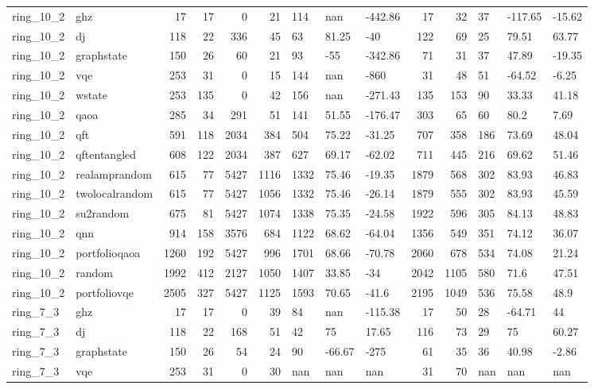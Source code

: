 \begin{longtable}{llrrrrlllrrlll}
ring\_10\_2 & ghz & 17 & 17 & 0 & 21 & 114 & nan & -442.86 & 17 & 32 & 37 & -117.65 & -15.62 \\
ring\_10\_2 & dj & 118 & 22 & 336 & 45 & 63 & 81.25 & -40 & 122 & 69 & 25 & 79.51 & 63.77 \\
ring\_10\_2 & graphstate & 150 & 26 & 60 & 21 & 93 & -55 & -342.86 & 71 & 31 & 37 & 47.89 & -19.35 \\
ring\_10\_2 & vqe & 253 & 31 & 0 & 15 & 144 & nan & -860 & 31 & 48 & 51 & -64.52 & -6.25 \\
ring\_10\_2 & wstate & 253 & 135 & 0 & 42 & 156 & nan & -271.43 & 135 & 153 & 90 & 33.33 & 41.18 \\
ring\_10\_2 & qaoa & 285 & 34 & 291 & 51 & 141 & 51.55 & -176.47 & 303 & 65 & 60 & 80.2 & 7.69 \\
ring\_10\_2 & qft & 591 & 118 & 2034 & 384 & 504 & 75.22 & -31.25 & 707 & 358 & 186 & 73.69 & 48.04 \\
ring\_10\_2 & qftentangled & 608 & 122 & 2034 & 387 & 627 & 69.17 & -62.02 & 711 & 445 & 216 & 69.62 & 51.46 \\
ring\_10\_2 & realamprandom & 615 & 77 & 5427 & 1116 & 1332 & 75.46 & -19.35 & 1879 & 568 & 302 & 83.93 & 46.83 \\
ring\_10\_2 & twolocalrandom & 615 & 77 & 5427 & 1056 & 1332 & 75.46 & -26.14 & 1879 & 555 & 302 & 83.93 & 45.59 \\
ring\_10\_2 & su2random & 675 & 81 & 5427 & 1074 & 1338 & 75.35 & -24.58 & 1922 & 596 & 305 & 84.13 & 48.83 \\
ring\_10\_2 & qnn & 914 & 158 & 3576 & 684 & 1122 & 68.62 & -64.04 & 1356 & 549 & 351 & 74.12 & 36.07 \\
ring\_10\_2 & portfolioqaoa & 1260 & 192 & 5427 & 996 & 1701 & 68.66 & -70.78 & 2060 & 678 & 534 & 74.08 & 21.24 \\
ring\_10\_2 & random & 1992 & 412 & 2127 & 1050 & 1407 & 33.85 & -34 & 2042 & 1105 & 580 & 71.6 & 47.51 \\
ring\_10\_2 & portfoliovqe & 2505 & 327 & 5427 & 1125 & 1593 & 70.65 & -41.6 & 2195 & 1049 & 536 & 75.58 & 48.9 \\
ring\_7\_3 & ghz & 17 & 17 & 0 & 39 & 84 & nan & -115.38 & 17 & 50 & 28 & -64.71 & 44 \\
ring\_7\_3 & dj & 118 & 22 & 168 & 51 & 42 & 75 & 17.65 & 116 & 73 & 29 & 75 & 60.27 \\
ring\_7\_3 & graphstate & 150 & 26 & 54 & 24 & 90 & -66.67 & -275 & 61 & 35 & 36 & 40.98 & -2.86 \\
ring\_7\_3 & vqe & 253 & 31 & 0 & 30 & nan & nan & nan & 31 & 70 & nan & nan & nan \\

\end{longtable}
